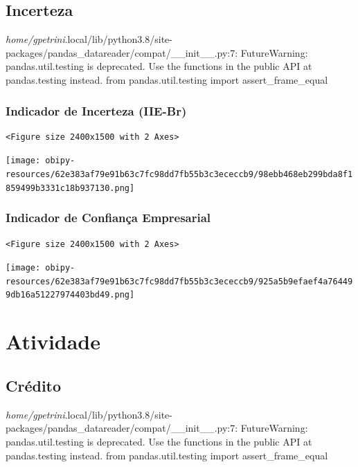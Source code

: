 \documentclass[11pt]{article}
\begin{document}
\subsection{Incerteza}
\label{sec:org4820402}

\emph{home/gpetrini}.local/lib/python3.8/site-packages/pandas\_datareader/compat/\_\_init\_\_.py:7: FutureWarning: pandas.util.testing is deprecated. Use the functions in the public API at pandas.testing instead.
  from pandas.util.testing import assert\_frame\_equal


\subsubsection{Indicador de Incerteza (IIE-Br)}
\label{sec:org90386f0}

\begin{verbatim}
<Figure size 2400x1500 with 2 Axes>
\end{verbatim}


\begin{center}
\texttt{[image: obipy-resources/62e383af79e91b63c7fc98dd7fb55b3c3ececcb9/98ebb468eb299bda8f1859499b3331c18b937130.png]}
\end{center}


\subsubsection{Indicador de Confiança Empresarial}
\label{sec:orga29ed5c}

\begin{verbatim}
<Figure size 2400x1500 with 2 Axes>
\end{verbatim}


\begin{center}
\texttt{[image: obipy-resources/62e383af79e91b63c7fc98dd7fb55b3c3ececcb9/925a5b9efaef4a764499db16a51227974403bd49.png]}
\end{center}

\section{Atividade}
\label{sec:orgefc823a}

\subsection{Crédito}
\label{sec:org42f9407}

\emph{home/gpetrini}.local/lib/python3.8/site-packages/pandas\_datareader/compat/\_\_init\_\_.py:7: FutureWarning: pandas.util.testing is deprecated. Use the functions in the public API at pandas.testing instead.
  from pandas.util.testing import assert\_frame\_equal
\end{document}
